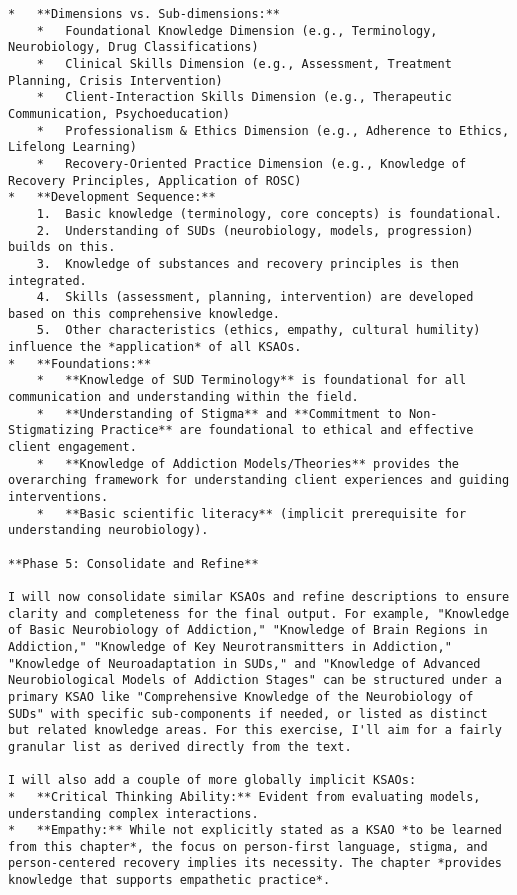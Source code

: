 \documentclass[
  letterpaper,
  DIV=11,
  numbers=noendperiod]{scrartcl}
\begin{document}
\begin{verbatim}
*   **Dimensions vs. Sub-dimensions:**
    *   Foundational Knowledge Dimension (e.g., Terminology, Neurobiology, Drug Classifications)
    *   Clinical Skills Dimension (e.g., Assessment, Treatment Planning, Crisis Intervention)
    *   Client-Interaction Skills Dimension (e.g., Therapeutic Communication, Psychoeducation)
    *   Professionalism & Ethics Dimension (e.g., Adherence to Ethics, Lifelong Learning)
    *   Recovery-Oriented Practice Dimension (e.g., Knowledge of Recovery Principles, Application of ROSC)
*   **Development Sequence:**
    1.  Basic knowledge (terminology, core concepts) is foundational.
    2.  Understanding of SUDs (neurobiology, models, progression) builds on this.
    3.  Knowledge of substances and recovery principles is then integrated.
    4.  Skills (assessment, planning, intervention) are developed based on this comprehensive knowledge.
    5.  Other characteristics (ethics, empathy, cultural humility) influence the *application* of all KSAOs.
*   **Foundations:**
    *   **Knowledge of SUD Terminology** is foundational for all communication and understanding within the field.
    *   **Understanding of Stigma** and **Commitment to Non-Stigmatizing Practice** are foundational to ethical and effective client engagement.
    *   **Knowledge of Addiction Models/Theories** provides the overarching framework for understanding client experiences and guiding interventions.
    *   **Basic scientific literacy** (implicit prerequisite for understanding neurobiology).

**Phase 5: Consolidate and Refine**

I will now consolidate similar KSAOs and refine descriptions to ensure clarity and completeness for the final output. For example, "Knowledge of Basic Neurobiology of Addiction," "Knowledge of Brain Regions in Addiction," "Knowledge of Key Neurotransmitters in Addiction," "Knowledge of Neuroadaptation in SUDs," and "Knowledge of Advanced Neurobiological Models of Addiction Stages" can be structured under a primary KSAO like "Comprehensive Knowledge of the Neurobiology of SUDs" with specific sub-components if needed, or listed as distinct but related knowledge areas. For this exercise, I'll aim for a fairly granular list as derived directly from the text.

I will also add a couple of more globally implicit KSAOs:
*   **Critical Thinking Ability:** Evident from evaluating models, understanding complex interactions.
*   **Empathy:** While not explicitly stated as a KSAO *to be learned from this chapter*, the focus on person-first language, stigma, and person-centered recovery implies its necessity. The chapter *provides knowledge that supports empathetic practice*.
\end{verbatim}
\end{document}
